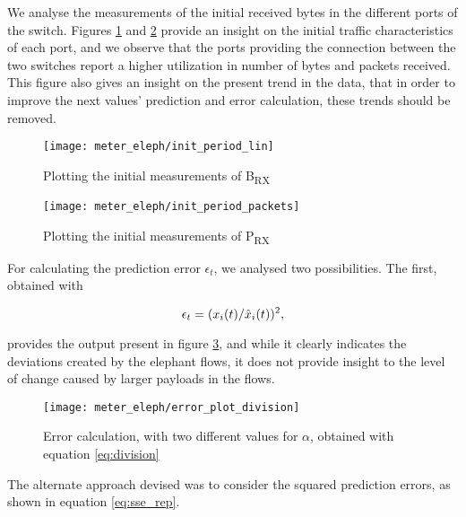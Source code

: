 \par We analyse the measurements of the initial received bytes in the different ports of the switch. Figures \ref{fig:init_plot} and \ref{fig:init_plot_pkts} provide
an insight on the initial traffic characteristics of each port, and we observe that the ports providing the connection between the two switches report a higher
utilization in number of bytes and packets received. This figure also gives an insight on the present trend in the data, that in order to improve the next
values' prediction and error calculation, these trends should be removed.

\begin{figure}[H]
    \centering
    \texttt{[image: meter\_eleph/init\_period\_lin]}
    \caption {Plotting the initial measurements of B\textsubscript{RX}}
    \label{fig:init_plot}
\end{figure} 

\begin{figure}[H]
    \centering
    \texttt{[image: meter\_eleph/init\_period\_packets]}
    \caption {Plotting the initial measurements of P\textsubscript{RX}}
    \label{fig:init_plot_pkts}
\end{figure} 

\par For calculating the prediction error $\epsilon_t$, we analysed two possibilities. The first, obtained with

\begin{equation}
    \centering
    \label{eq:division}
    \epsilon_t = (x_i(t)/\hat{x}_i(t))^2,
\end{equation}

\par provides the output present in figure \ref{fig:error_plot_division}, and while it clearly indicates the deviations created by the elephant flows, it 
does not provide insight to the level of change caused by larger payloads in the flows.

\begin{figure}[H]
    \centering
    \texttt{[image: meter\_eleph/error\_plot\_division]}
    \caption{Error calculation, with two different values for $\alpha$, obtained with equation \ref{eq:division}}
    \label{fig:error_plot_division}
\end{figure}

\par The alternate approach devised was to consider the squared prediction errors, as shown in equation \ref{eq:sse_rep}.


